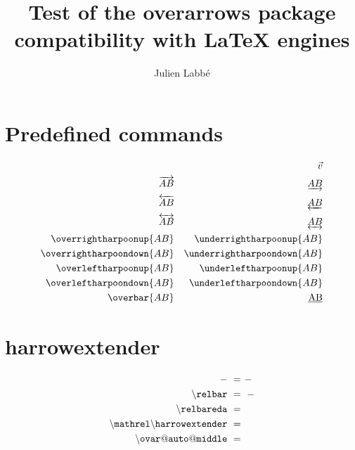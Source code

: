 \documentclass{article}
\title{Test of the \textsf{overarrows} package\\compatibility with \LaTeX{} engines}
\author{Julien Labb\'e}
\begin{document}
\maketitle

\section*{Predefined commands}


\begin{dispExample}
\begin{align*}
  \vv{AB}                   &  & \vec{v}                    \\
  \overrightarrow{AB}       &  & \underrightarrow{AB}       \\
  \overleftarrow{AB}        &  & \underleftarrow{AB}        \\
  \overleftrightarrow{AB}   &  & \underleftrightarrow{AB}   \\
  \overrightharpoonup{AB}   &  & \underrightharpoonup{AB}   \\
  \overrightharpoondown{AB} &  & \underrightharpoondown{AB} \\
  \overleftharpoonup{AB}    &  & \underleftharpoonup{AB}    \\
  \overleftharpoondown{AB}  &  & \underleftharpoondown{AB}  \\
  \overbar{AB}              &  & \underbar{AB}
\end{align*}
\end{dispExample}

\section*{harrowextender}

\ifundef{\harrowextender}{\gdef\harrowextender{}}{}
\ifundef{\relbareda}{\gdef\relbareda{}}{}

\begin{dispExample}
  \begin{align*}
    \mathtt{-} ~=~                                            & -                       \\
    \mathtt{\backslash relbar} ~=~                            & \relbar                 \\
    \mathtt{\backslash relbareda} ~=~                         & \relbareda              \\
    \mathtt{\backslash mathrel \backslash harrowextender} ~=~ & \mathrel{\harrowextender} \\
    \mathtt{\backslash ovar@auto@middle} ~=~                  & \UseName{ovar@auto@middle}
  \end{align*}
\end{dispExample}
\end{document}
